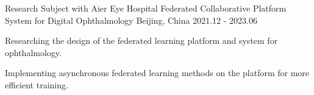 \begin{cventries}
\cventry
{Research Subject with Aier Eye Hospital} %
{Federated Collaborative Platform System for Digital Ophthalmology} %
{Beijing, China} %
{2021.12 - 2023.06} %
{
    \begin{cvitems}
        \item {Researching the design of the federated learning platform and system for ophthalmology.}
        \item {Implementing asynchronous federated learning methods on the platform for more efficient training.}
    \end{cvitems}
}




\end{cventries}
